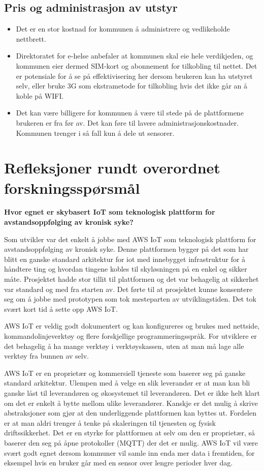 \subsection{Pris og administrasjon av utstyr}
\begin{itemize}
    \item Det er en stor kostnad for kommunen å administrere og vedlikeholde nettbrett.
    \item Direktoratet for e-helse anbefaler at kommunen skal eie hele verdikjeden, og kommunen eier
        dermed SIM-kort og abonnement for tilkobling til nettet. Det er potensiale for å se på
        effektivisering her dersom brukeren kan ha utstyret selv, eller bruke 3G som ekstrametode
        for tilkobling hvis det ikke går an å koble på WIFI.
    \item Det kan være billigere for kommunen å være til stede på de plattformene brukeren er fra før av.
        Det kan føre til lavere administrasjonskostnader. Kommunen trenger i så fall kun å dele ut sensorer.
\end{itemize}

\section{Refleksjoner rundt overordnet forskningsspørsmål}
\textbf{Hvor egnet er skybasert IoT som teknologisk plattform for avstandsoppfølging av kronisk syke?}

Som utvikler var det enkelt å jobbe med AWS IoT som teknologisk plattform for avstandsoppfølging av kronisk
syke. Denne plattformen bygger på det som har blitt en ganske standard arkitektur for \gls{iot}
med innebygget infrastruktur for å håndtere ting og hvordan tingene kobles til skyløsningen på en enkel og sikker
måte. Prosjektet hadde stor tillit til plattformen og det var behagelig at sikkerhet var standard
og med fra starten av. Det førte til at prosjektet kunne konsentere seg om å jobbe med prototypen som tok
mesteparten av utviklingstiden. Det tok svært kort tid å sette opp AWS IoT.

AWS IoT er veldig godt dokumentert og kan konfigureres og brukes med nettside, kommandolinjeverktøy og
flere forskjellige programmeringsspråk. For utviklere er det behagelig å ha mange verktøy i verktøyskassen,
uten at man må lage alle verktøy fra bunnen av selv.

AWS IoT er en proprietær og kommersiell
tjeneste som baserer seg på ganske standard arkitektur. Ulempen med å velge en slik leverandør er at man kan
bli ganske låst til leverandøren og økosystemet til leverandøren. Det er ikke helt klart om det er enkelt
å bytte mellom ulike leverandører. Kanskje er det mulig å skrive abstraksjoner som gjør at den underliggende
plattformen kan byttes ut. Fordelen er at man aldri trenger å tenke på skaleringen til tjenesten
og fysisk driftssikkerhet. Det er en styrke for plattformen at selv om den er proprietær, så baserer den seg på åpne protokoller
(MQTT) der det er mulig.
AWS IoT vil være svært godt egnet dersom kommuner vil samle inn enda mer
data i fremtiden, for eksempel hvis en bruker går med en sensor over lengre perioder hver dag.


